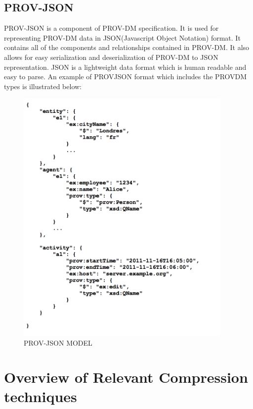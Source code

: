 \subsection{PROV-JSON}

PROV-JSON is a component of PROV-DM specification. It is used for representing PROV-DM data in JSON(Javascript Object Notation) format. It contains all of the components and relationships contained in PROV-DM. It also allows for easy serialization and deserialization of PROV-DM to JSON representation. JSON is a lightweight data format which is human readable and easy to parse. An example of PROV\-JSON format which includes the PROV\-DM types is illustrated below:

\begin{figure}[h]
\begin{center}

\includegraphics[height=5in]{prov_json.png}
\end{center}
\caption{PROV-JSON MODEL}

\end{figure}



\section{Overview of Relevant Compression techniques}


